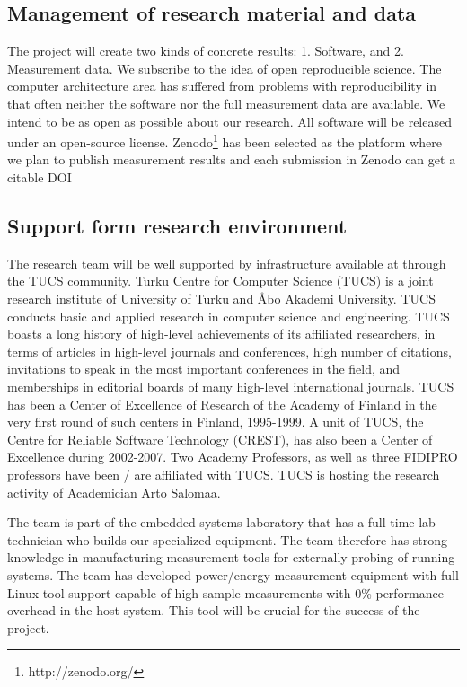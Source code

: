 \documentclass{article}
\begin{document}
\subsection{Management of research material and data}
The project will create two kinds of concrete results: 1. Software, and 2. Measurement data. 
We subscribe to the idea of open reproducible science. 
The computer architecture area has suffered from problems with reproducibility in that often neither the software nor the full measurement data are available. 
We intend to be as open as possible about our research. 
All software will be released under an open-source license. 
Zenodo\footnote{http://zenodo.org/} has been selected as the platform where we plan to publish measurement results and each submission in Zenodo can get a citable DOI

\subsection{Support form research environment}
The research team will be well supported by infrastructure available at through the TUCS community. 
Turku Centre for Computer Science (TUCS) is a joint research institute of University of Turku and \AA{}bo Akademi University. 
TUCS conducts basic and applied research in computer science and engineering. 
TUCS boasts a long history of high-level achievements of its affiliated researchers, in terms of articles in high-level journals and conferences, high number of citations, 
invitations to speak in the most important conferences in the field, and memberships in editorial boards of many high-level international journals. 
TUCS has been a Center of Excellence of Research of the Academy of Finland in the very first round of such centers in Finland, 1995-1999. 
A unit of TUCS, the Centre for Reliable Software Technology (CREST), has also been a Center of Excellence during 2002-2007. 
Two Academy Professors, as well as three FIDIPRO professors have been / are affiliated with TUCS. 
TUCS is hosting the research activity of Academician Arto Salomaa.

The team is part of the embedded systems laboratory that has a full time lab technician who builds our specialized equipment. 
The team therefore has strong knowledge in manufacturing measurement tools for externally probing of running systems. 
The team has developed power/energy measurement equipment with full Linux tool support capable of high-sample measurements with 0\% performance overhead in the host system. 
This tool will be crucial for the success of the project.
\end{document}
